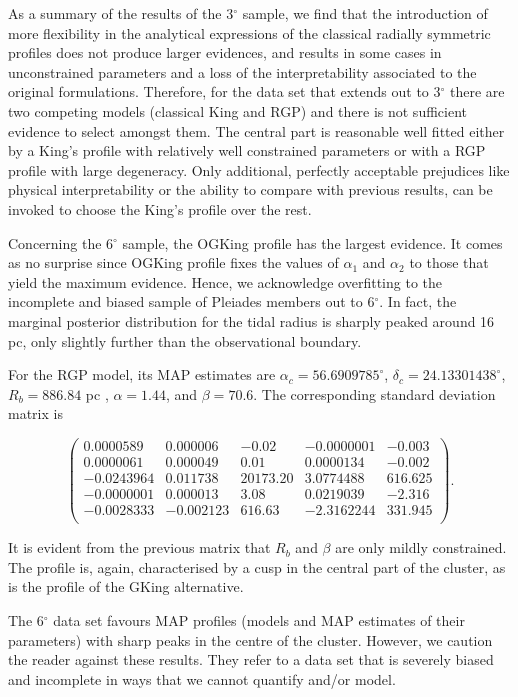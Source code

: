 As a summary of the results of the 3$^{\circ}$ sample, we find that the introduction of more flexibility in the analytical expressions of the classical radially symmetric profiles does not produce larger evidences, and results in some cases in unconstrained parameters and a loss of the interpretability associated to the original formulations. Therefore, for the data set that extends out to 3$^{\circ}$ there are two competing models (classical King and RGP) and there is not sufficient evidence to select amongst them. The central part is reasonable well fitted either by a King's profile with relatively well constrained parameters or with a RGP profile with large degeneracy.  Only additional, perfectly acceptable prejudices like physical interpretability or the ability to compare with previous results, can be invoked to choose the King's profile over the rest.


Concerning the 6$^{\circ}$ sample, the OGKing profile has the largest evidence. It comes as no surprise since OGKing profile fixes the values of $\alpha_1$ and $\alpha_2$ to those that yield the maximum evidence. Hence, we acknowledge overfitting to the incomplete and biased sample of Pleiades members out to 6$^{\circ}$. In fact, the marginal posterior distribution for the tidal radius is sharply peaked around 16 pc, only slightly further than the observational boundary.

For the RGP model, its MAP estimates are $\alpha_c=56.6909785^{\circ}$, $\delta_c=24.13301438^{\circ}$, $R_b=886.84$ pc , $\alpha=1.44$, and $\beta=70.6$. The corresponding standard deviation matrix is

$$
\left(\begin{array}{rrrrr}
 0.0000589  & 0.000006 &   -0.02 &-0.0000001 &  -0.003  \\
 0.0000061 & 0.000049 &    0.01 & 0.0000134 &  -0.002\\
-0.0243964 & 0.011738 &20173.20 & 3.0774488 & 616.625\\
-0.0000001 & 0.000013 &    3.08 & 0.0219039 &  -2.316\\
-0.0028333 &-0.002123 &  616.63 &-2.3162244 & 331.945\\
\end{array}\right).
$$

It is evident from the previous matrix that $R_b$ and $\beta$ are only mildly constrained. The profile is, again, characterised by a cusp in the central part of the cluster, as is the profile of the GKing alternative. 

The 6$^{\circ}$ data set favours  MAP profiles (models and MAP estimates of their parameters) with sharp peaks in the centre of the cluster. However, we caution the reader against these results. They refer to a data set that is severely biased and incomplete in ways that we cannot quantify and/or model.

